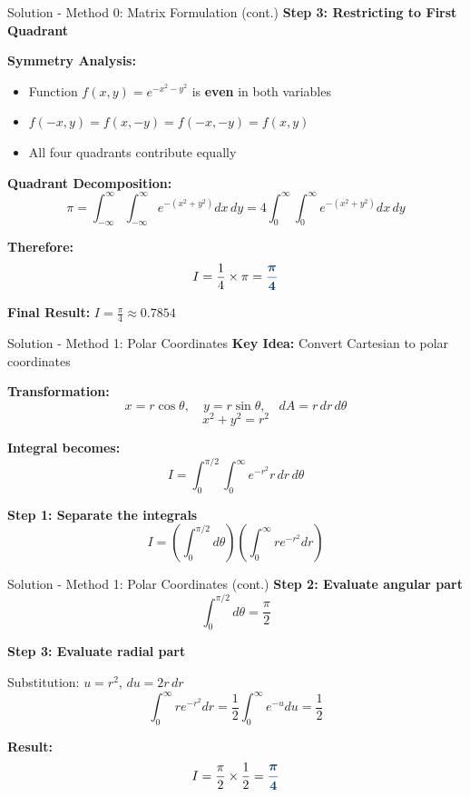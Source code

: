 \documentclass[12pt, aspectratio=169]{beamer}
\newcommand{\res}[1]{\textcolor{madblue}{\bm{#1}}}
\begin{document}
\begin{frame}{Solution - Method 0: Matrix Formulation (cont.)}
\textbf{Step 3: Restricting to First Quadrant}

\textbf{Symmetry Analysis:}
\begin{itemize}
    \item Function $f(x,y) = e^{-x^2-y^2}$ is \textbf{even} in both variables
    \item $f(-x,y) = f(x,-y) = f(-x,-y) = f(x,y)$
    \item All four quadrants contribute equally
\end{itemize}

\vspace{0.3cm}

\textbf{Quadrant Decomposition:}
\[
\pi = \int_{-\infty}^{\infty} \int_{-\infty}^{\infty} e^{-(x^2+y^2)} dx\,dy
= 4 \int_0^{\infty} \int_0^{\infty} e^{-(x^2+y^2)} dx\,dy
\]

\textbf{Therefore:}
\[
I = \frac{1}{4} \times \pi = \res{\frac{\pi}{4}}
\]

\vspace{0.3cm}

\textbf{Final Result:} $\boxed{I = \frac{\pi}{4} \approx 0.7854}$
\end{frame}

\begin{frame}{Solution - Method 1: Polar Coordinates}
\textbf{Key Idea:} Convert Cartesian to polar coordinates

\textbf{Transformation:}
\[
x = r\cos\theta, \quad y = r\sin\theta, \quad dA = r\,dr\,d\theta
\]
\[
x^2 + y^2 = r^2
\]

\textbf{Integral becomes:}
\[
I = \int_0^{\pi/2} \int_0^\infty e^{-r^2} r \, dr\,d\theta
\]

\textbf{Step 1: Separate the integrals}
\[
I = \left(\int_0^{\pi/2} d\theta\right) \left(\int_0^\infty r e^{-r^2} dr\right)
\]
\end{frame}

\begin{frame}{Solution - Method 1: Polar Coordinates (cont.)}
\textbf{Step 2: Evaluate angular part}
\[
\int_0^{\pi/2} d\theta = \frac{\pi}{2}
\]

\textbf{Step 3: Evaluate radial part}

Substitution: $u = r^2$, $du = 2r\,dr$
\[
\int_0^\infty r e^{-r^2} dr = \frac{1}{2}\int_0^\infty e^{-u} du = \frac{1}{2}
\]

\textbf{Result:}
\[
I = \frac{\pi}{2} \times \frac{1}{2} = \res{\frac{\pi}{4}}
\]
\end{frame}
\end{document}
